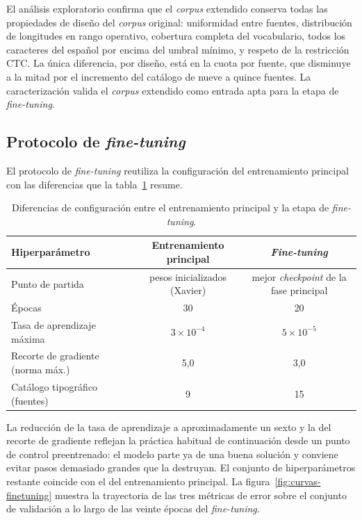 El análisis exploratorio confirma que el \textit{corpus} extendido conserva todas las propiedades de diseño del \textit{corpus} original: uniformidad entre fuentes, distribución de longitudes en rango operativo, cobertura completa del vocabulario, todos los caracteres del español por encima del umbral mínimo, y respeto de la restricción CTC. La única diferencia, por diseño, está en la cuota por fuente, que disminuye a la mitad por el incremento del catálogo de nueve a quince fuentes. La caracterización valida el \textit{corpus} extendido como entrada apta para la etapa de \textit{fine-tuning}.

\subsection{Protocolo de \textit{fine-tuning}}
\label{subsec:protocolo-finetune}

El protocolo de \textit{fine-tuning} reutiliza la configuración del entrenamiento principal con las diferencias que la tabla~\ref{tab:diff-finetune} resume.

\begin{table}[!htbp]
	\centering
	\caption{Diferencias de configuración entre el entrenamiento principal y la etapa de \textit{fine-tuning}.}
	\label{tab:diff-finetune}
	\scriptsize
	\begin{tabular}{lcc}
		\toprule
		\textbf{Hiperparámetro} & \textbf{Entrenamiento principal} & \textbf{\textit{Fine-tuning}} \\
		\midrule
		Punto de partida & pesos inicializados (Xavier) & mejor \textit{checkpoint} de la fase principal \\
		Épocas & 30 & 20 \\
		Tasa de aprendizaje máxima & $3 \times 10^{-4}$ & $5 \times 10^{-5}$ \\
		Recorte de gradiente (norma máx.) & 5,0 & 3,0 \\
		Catálogo tipográfico (fuentes) & 9 & 15 \\
		\bottomrule
	\end{tabular}
\end{table}

La reducción de la tasa de aprendizaje a aproximadamente un sexto y la del recorte de gradiente reflejan la práctica habitual de continuación desde un punto de control preentrenado: el modelo parte ya de una buena solución y conviene evitar pasos demasiado grandes que la destruyan. El conjunto de hiperparámetros restante coincide con el del entrenamiento principal. La figura~\ref{fig:curvas-finetuning} muestra la trayectoria de las tres métricas de error sobre el conjunto de validación a lo largo de las veinte épocas del \textit{fine-tuning}.

